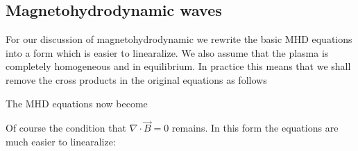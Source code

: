 \subsection{Magnetohydrodynamic waves}


For our discussion of magnetohydrodynamic we rewrite the basic MHD equations into a form which is easier to linearalize. We also assume that the plasma is completely homogeneous and in equilibrium. In practice this means that we shall remove the cross products in the original equations as follows 

{\centering 
{}
\par}


The MHD equations now become

{\centering 
\noindent {}
\par}

Of course the condition that $ \nabla \cdot \vec{B} = 0  $ remains. In this form the equations are much easier to linearalize:

